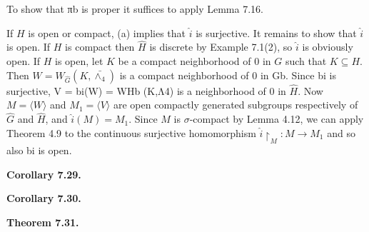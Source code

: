 \documentclass[12pt]{article}
\begin{document}
    To show that πb is proper it suffices to apply Lemma 7.16.


    If $H$ is open or compact, (a) implies that $\hat{i}$ is surjective. It remains to show that $\hat{i}$ is open. If $H$ is compact
then $\hat{H}$ is discrete by Example 7.1(2), so $\hat{i}$ is obviously open. If $H$ is open, let $K$ be a compact neighborhood
of 0 in $G$ such that $K \subseteq H$. Then $W = W_{\hat{G}}(K,\bar{\wedge_4})$ is a compact neighborhood of 0 in Gb. Since bi is surjective,
V = bi(W) = WHb (K,Λ4) is a neighborhood of 0 in $\hat{H}$. Now $M = \langle W \rangle$ and $M_1 = \langle V \rangle$ are open compactly
generated subgroups respectively of $\hat{G}$ and $\hat{H}$, and $\hat{i}(M) = M_1$. Since $M$ is $\sigma$-compact by Lemma 4.12, we can
apply Theorem 4.9 to the continuous surjective homomorphism $\hat{i} \upharpoonright_M: M \to M_1$ and so also bi is open.


\textbf{Corollary 7.29.}


\textbf{Corollary 7.30.}


\textbf{Theorem 7.31.}
\end{document}
